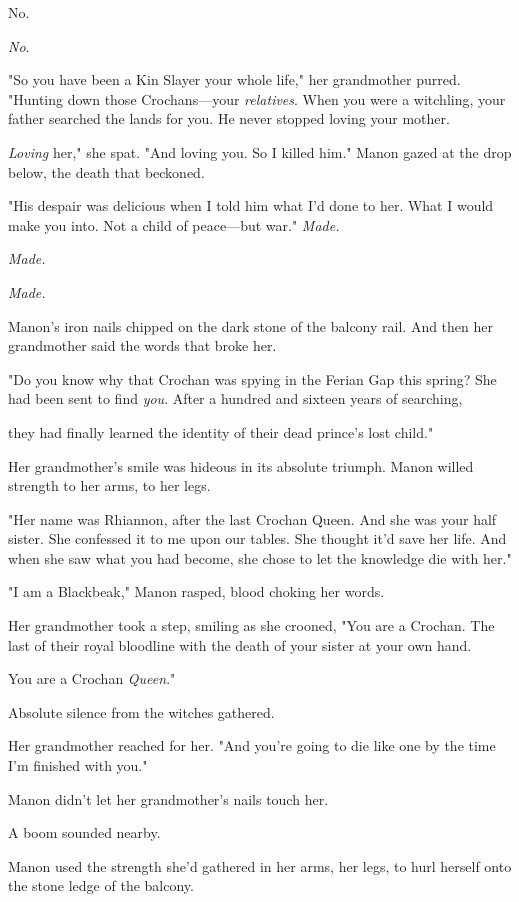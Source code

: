 No.

\emph{No}.

"So you have been a Kin Slayer your whole life," her grandmother purred.
"Hunting down those Crochans---your \emph{relatives}.
When you were a witchling, your father searched the lands for you.
He never stopped loving your mother.

\emph{Loving} her," she spat.
"And loving you.
So I killed him."
Manon gazed at the drop below, the death that beckoned.

"His despair was delicious when I told him what I'd done to her.
What I would make you into.
Not a child of peace---but war."
\emph{Made.}

\emph{Made.}

\emph{Made.}

Manon's iron nails chipped on the dark stone of the balcony rail.
And then her grandmother said the words that broke her.

"Do you know why that Crochan was spying in the Ferian Gap this spring?
She had been sent to find \emph{you}.
After a hundred and sixteen years of searching,

they had finally learned the identity of their dead prince's lost child."

Her grandmother's smile was hideous in its absolute triumph.
Manon willed strength to her arms, to her legs.

"Her name was Rhiannon, after the last Crochan Queen.
And she was your half sister.
She confessed it to me upon our tables.
She thought it'd save her life.
And when she saw what you had become, she chose to let the knowledge die with her."

"I am a Blackbeak," Manon rasped, blood choking her words.

Her grandmother took a step, smiling as she crooned, "You are a Crochan.
The last of their royal bloodline with the death of your sister at your own hand.

You are a Crochan \emph{Queen}."

Absolute silence from the witches gathered.

Her grandmother reached for her.
"And you're going to die like one by the time I'm finished with you."

Manon didn't let her grandmother's nails touch her.

A boom sounded nearby.

Manon used the strength she'd gathered in her arms, her legs, to hurl herself onto the stone ledge of the balcony.

